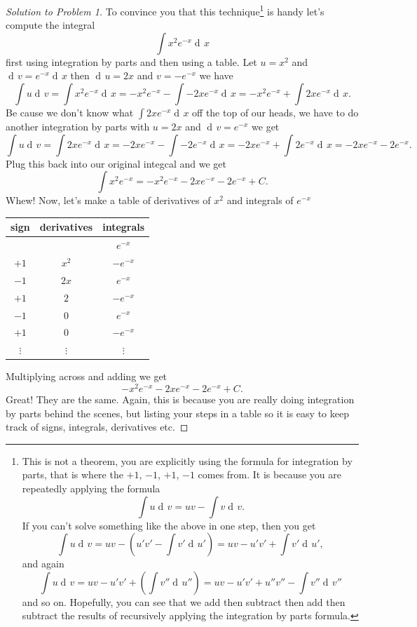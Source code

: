 \documentclass[12pt]{article}
\theoremstyle{plain}
\theoremstyle{definition}
\theoremstyle{remark}
\DeclareMathOperator{\diff}{d\!}
\begin{document}
\begin{proof}[Solution to Problem 1]
To convince you that this technique\footnote{This is not a
  theorem, you are explicitly using the formula for integration by
  parts, that is where the $+1$, $-1$, $+1$, $-1$ comes from. It is because
you are repeatedly applying the formula
\[
\int u\diff v=uv-\int v\diff v.
\]
If you can't solve something like the above in one step, then you get
\[
\int u\diff v=uv-\left(u' v'-\int v'\diff u'\right)=uv-u'v'+\int v'\diff u',
\]
and again
\[
\int u\diff v=uv-u'v'+\left(\int v''\diff u''\right)=uv-u'v'+u''v''-\int v''\diff v''
\]
and so on. Hopefully, you can see that we add then subtract then add then
subtract the results of recursively applying the integration by parts formula.
} is handy let's compute the integral
\[
\int x^2e^{-x}\diff x
\]
first using integration by parts and then using a table. Let $u=x^2$ and
$\diff v=e^{-x}\diff x$ then $\diff u=2x$ and $v=-e^{-x}$
we have
\[
\int u\diff v=\int x^2e^{-x}\diff x=-x^2e^{-x}-\int -2xe^{-x}\diff x
=-x^2e^{-x}+\int 2xe^{-x}\diff x.
\]
Be cause we don't know what $\int 2xe^{-x}\diff x$  off the top of our
heads, we have to do another integration by parts with $u=2x$ and $\diff
v=e^{-x}$ we get
\[
\int u\diff v=\int 2xe^{-x}\diff x=-2xe^{-x}-\int -2e^{-x}\diff
x=-2xe^{-x}+\int 2e^{-x}\diff x=-2xe^{-x}-2e^{-x}.
\]
Plug this back into our original integcal and we get
\[
\int x^2e^{-x}=-x^2e^{-x}-2xe^{-x}-2e^{-x}+C.
\]
Whew! Now, let's make a table of derivatives of $x^2$ and integrals of
$e^{-x}$
\begin{center}
\begin{tabular}{|c|c|c|}
\hline
sign&derivatives&integrals\\
\hline
~&~&$e^{-x}$\\
$+1$&$x^2$&$-e^{-x}$\\
$-1$&$2x$&$e^{-x}$\\
$+1$&$2$&$-e^{-x}$\\
$-1$&$0$&$e^{-x}$\\
$+1$&$0$&$-e^{-x}$\\
$\vdots$&$\vdots$&$\vdots$\\
\hline
\end{tabular}
\end{center}
Multiplying across and adding we get
\[
-x^2e^{-x}-2xe^{-x}-2e^{-x}+C.
\]
Great! They are the same. Again, this is because you are really doing
integration by parts behind the scenes, but listing your steps in a table
so it is easy to keep track of signs, integrals, derivatives etc.
\end{proof}
\end{document}
